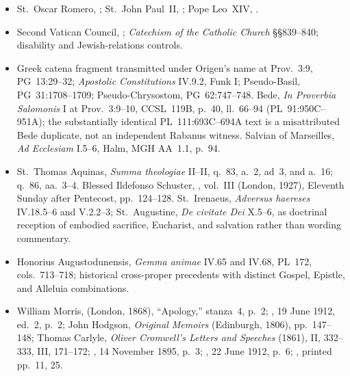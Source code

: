 {\begin{itemize}[itemsep=0em,topsep=0.15em,parsep=0pt]
(1913), pp.~129--131, 188.
\item St.~Oscar Romero, ;
St.~John Paul~II, ;
Pope Leo~XIV, .
\item Second Vatican Council, ;
\emph{Catechism of the Catholic Church} §§839--840; disability and
Jewish-relations controls.
\item Greek catena fragment transmitted under Origen's name at Prov.~3:9,
PG~13:29--32; \emph{Apostolic Constitutions} IV.9.2, Funk I; Pseudo-Basil,
PG~31:1708--1709; Pseudo-Chrysostom, PG~62:747--748. Bede,
\emph{In Proverbia Salomonis} I at Prov.~3:9--10, CCSL~119B, p.~40,
ll.~66--94 (PL~91:950C--951A); the substantially identical PL~111:693C--694A
text is a misattributed Bede duplicate, not an independent Rabanus witness.
Salvian of Marseilles, \emph{Ad Ecclesiam} I.5--6, Halm, MGH AA~1.1, p.~94.
\item St.~Thomas Aquinas, \emph{Summa theologiae} II--II, q.~83, a.~2,
ad~3, and a.~16; q.~86, aa.~3--4. Blessed Ildefonso Schuster,
, vol.~III (London, 1927), Eleventh Sunday after Pentecost, pp.~124--128.
St.~Irenaeus, \emph{Adversus haereses} IV.18.5--6 and V.2.2--3;
St.~Augustine, \emph{De civitate Dei} X.5--6, as doctrinal reception of
embodied sacrifice, Eucharist, and salvation rather than wording commentary.
\item Honorius Augustodunensis, \emph{Gemma animae} IV.65 and IV.68,
PL~172, cols.~713--718; historical cross-proper precedents with distinct
Gospel, Epistle, and Alleluia combinations.
\item William Morris, 
(London, 1868), ``Apology,'' stanza~4, p.~2;
, 19 June 1912,
ed.~2, p.~2; John Hodgson, \emph{Original Memoirs} (Edinburgh, 1806),
pp.~147--148; Thomas Carlyle, \emph{Oliver Cromwell's Letters and Speeches}
(1861), II, 332--333, III, 171--172;
, 14 November 1895, p.~3;
, 22 June 1912, p.~6;
, printed pp.~11, 25.
\end{itemize}
}

